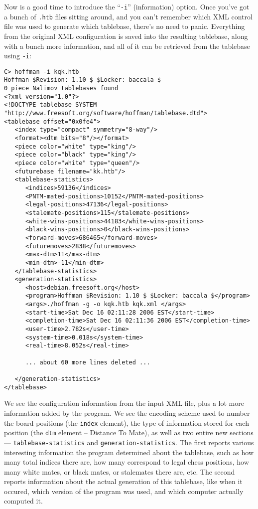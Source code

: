 \documentclass[11pt]{article}
\begin{document}
Now is a good time to introduce the ``{\tt -i}'' (information) option.
Once you've got a bunch of {\tt .htb} files sitting around, and you
can't remember which XML control file was used to generate which
tablebase, there's no need to panic.  Everything from the original XML
configuration is saved into the resulting tablebase, along with a
bunch more information, and all of it can be retrieved from the
tablebase using {\tt -i}:

{\small\begin{verbatim}
C> hoffman -i kqk.htb
Hoffman $Revision: 1.10 $ $Locker: baccala $
0 piece Nalimov tablebases found
<?xml version="1.0"?>
<!DOCTYPE tablebase SYSTEM "http://www.freesoft.org/software/hoffman/tablebase.dtd">
<tablebase offset="0x0fe4">
   <index type="compact" symmetry="8-way"/>
   <format><dtm bits="8"/></format>
   <piece color="white" type="king"/>
   <piece color="black" type="king"/>
   <piece color="white" type="queen"/>
   <futurebase filename="kk.htb"/>
   <tablebase-statistics>
      <indices>59136</indices>
      <PNTM-mated-positions>10152</PNTM-mated-positions>
      <legal-positions>47136</legal-positions>
      <stalemate-positions>115</stalemate-positions>
      <white-wins-positions>44183</white-wins-positions>
      <black-wins-positions>0</black-wins-positions>
      <forward-moves>686465</forward-moves>
      <futuremoves>2838</futuremoves>
      <max-dtm>11</max-dtm>
      <min-dtm>-11</min-dtm>
   </tablebase-statistics>
   <generation-statistics>
      <host>debian.freesoft.org</host>
      <program>Hoffman $Revision: 1.10 $ $Locker: baccala $</program>
      <args>./hoffman -g -o kqk.htb kqk.xml </args>
      <start-time>Sat Dec 16 02:11:28 2006 EST</start-time>
      <completion-time>Sat Dec 16 02:11:36 2006 EST</completion-time>
      <user-time>2.782s</user-time>
      <system-time>0.018s</system-time>
      <real-time>8.052s</real-time>

      ... about 60 more lines deleted ...

   </generation-statistics>
</tablebase>
\end{verbatim}}

We see the configuration information from the input XML file, plus a
 lot more information added by the program.  We see the encoding
 scheme used to number the board positions (the {\tt index} element),
 the type of information stored for each position (the {\tt dtm}
 element -- Distance To Mate), as well as two entire new sections ---
 {\tt tablebase-statistics} and {\tt generation-statistics}.  The
 first reports various interesting information the program determined
 about the tablebase, such as how many total indices there are, how
 many correspond to legal chess positions, how many white mates, or
 black mates, or stalemates there are, etc.  The second reports
 information about the actual generation of this tablebase, like when
 it occured, which version of the program was used, and which computer
 actually computed it.
\end{document}
